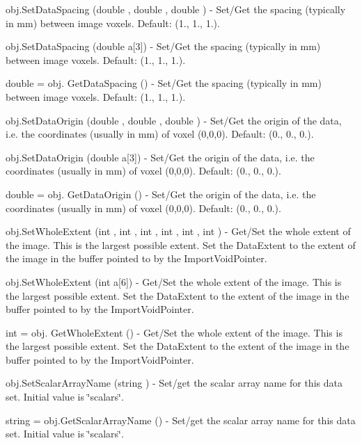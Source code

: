 \begin{DoxyItemize}
\item {\ttfamily obj.\-Set\-Data\-Spacing (double , double , double )} -\/ Set/\-Get the spacing (typically in mm) between image voxels. Default\-: (1., 1., 1.).  
\item {\ttfamily obj.\-Set\-Data\-Spacing (double a\mbox{[}3\mbox{]})} -\/ Set/\-Get the spacing (typically in mm) between image voxels. Default\-: (1., 1., 1.).  
\item {\ttfamily double = obj. Get\-Data\-Spacing ()} -\/ Set/\-Get the spacing (typically in mm) between image voxels. Default\-: (1., 1., 1.).  
\item {\ttfamily obj.\-Set\-Data\-Origin (double , double , double )} -\/ Set/\-Get the origin of the data, i.\-e. the coordinates (usually in mm) of voxel (0,0,0). Default\-: (0., 0., 0.).  
\item {\ttfamily obj.\-Set\-Data\-Origin (double a\mbox{[}3\mbox{]})} -\/ Set/\-Get the origin of the data, i.\-e. the coordinates (usually in mm) of voxel (0,0,0). Default\-: (0., 0., 0.).  
\item {\ttfamily double = obj. Get\-Data\-Origin ()} -\/ Set/\-Get the origin of the data, i.\-e. the coordinates (usually in mm) of voxel (0,0,0). Default\-: (0., 0., 0.).  
\item {\ttfamily obj.\-Set\-Whole\-Extent (int , int , int , int , int , int )} -\/ Get/\-Set the whole extent of the image. This is the largest possible extent. Set the Data\-Extent to the extent of the image in the buffer pointed to by the Import\-Void\-Pointer.  
\item {\ttfamily obj.\-Set\-Whole\-Extent (int a\mbox{[}6\mbox{]})} -\/ Get/\-Set the whole extent of the image. This is the largest possible extent. Set the Data\-Extent to the extent of the image in the buffer pointed to by the Import\-Void\-Pointer.  
\item {\ttfamily int = obj. Get\-Whole\-Extent ()} -\/ Get/\-Set the whole extent of the image. This is the largest possible extent. Set the Data\-Extent to the extent of the image in the buffer pointed to by the Import\-Void\-Pointer.  
\item {\ttfamily obj.\-Set\-Scalar\-Array\-Name (string )} -\/ Set/get the scalar array name for this data set. Initial value is \char`\"{}scalars\char`\"{}.  
\item {\ttfamily string = obj.\-Get\-Scalar\-Array\-Name ()} -\/ Set/get the scalar array name for this data set. Initial value is \char`\"{}scalars\char`\"{}.  

\end{DoxyItemize}
